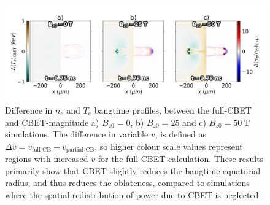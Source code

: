 \begin{figure}[t!]
    \includegraphics[width=\linewidth]{Results2/Images/CBETshape_stag_diff.png}
    \centering
    \caption{Difference in $n_e$ and $T_e$ bangtime profiles, between the full-\ac{CBET} and \ac{CBET}-magnitude a) $B_{z0}=0$, b) $B_{z0}=25$ and c) $B_{z0}=50\ \text{T}$ simulations.
    The difference in variable $v$, is defined as $\Delta v = v_{\text{full-CB}}-v_{\text{partial-CB}}$, so higher colour scale values represent regions with increased $v$ for the full-\ac{CBET} calculation.
    These results primarily show that \ac{CBET} slightly reduces the bangtime equatorial radius, and thus reduces the oblateness, compared to simulations where the spatial redistribution of power due to \ac{CBET} is neglected.}%
    \label{fig:Res2_CBETshape_diff}
\end{figure}

